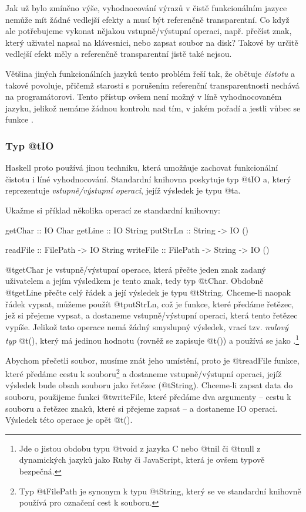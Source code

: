 Jak už bylo zmíněno výše, vyhodnocování výrazů v čistě funkcionálním jazyce
nemůže mít žádné vedlejší efekty a musí být referenčně transparentní. Co když
ale potřebujeme vykonat nějakou vstupně/výstupní operaci, např. přečíst znak,
který uživatel napsal na klávesnici, nebo zapsat soubor na disk? Takové
 by určitě vedlejší efekt měly a referenčně transparentní jistě také
nejsou.

Většina jiných funkcionálních jazyků tento problém řeší tak, že obětuje
\emph{čistotu} a takové  povoluje, přičemž starosti s
porušením referenční transparentnosti nechává na programátorovi. Tento přístup
ovšem není možný v líně vyhodnocovaném jazyku, jelikož nemáme žádnou kontrolu
nad tím, v jakém pořadí a jestli vůbec se funkce .

\subsubsection{\texorpdfstring{Typ @t{IO}}{Typ IO}}

Haskell proto používá jinou techniku, která umožňuje zachovat funkcionální
čistotu i líné vyhodnocování. Standardní knihovna poskytuje typ @t{IO a}, který
reprezentuje \emph{vstupně/výstupní operaci}, jejíž výsledek je typu @t{a}.

Ukažme si příklad několika operací ze standardní knihovny:

\begin{haskell}
getChar :: IO Char
getLine :: IO String
putStrLn :: String -> IO ()

readFile :: FilePath -> IO String
writeFile :: FilePath -> String -> IO ()
\end{haskell}

@t{getChar} je vstupně/výstupní operace, která přečte jeden znak zadaný
uživatelem a jejím výsledkem je tento znak, tedy typ @t{Char}. Obdobně
@t{getLine} přečte celý řádek a její výsledek je typu @t{String}. Chceme-li
naopak řádek vypsat, můžeme použít @t{putStrLn}, což je funkce, které předáme
řetězec, jež si přejeme vypsat, a dostaneme vstupně/výstupní operaci, která
tento řetězec vypíše. Jelikož tato operace nemá žádný smyslupný výsledek, vrací
tzv. \emph{nulový typ} @t{()}, který má jedinou hodnotu (rovněž se zapisuje
@t{()}) a používá se jako .\footnote{Jde o jistou obdobu typu
  @t{void} z jazyka C nebo @t{nil} či @t{null} z dynamických jazyků jako Ruby či
JavaScript, která je ovšem typově bezpečná.}

Abychom přečetli soubor, musíme znát jeho umístění, proto je @t{readFile}
funkce, které předáme cestu k souboru\footnote{Typ @t{FilePath} je synonym k
  typu @t{String}, který se ve standardní knihovně používá pro označení cest k
souboru.} a dostaneme vstupně/výstupní operaci, jejíž výsledek bude obsah
souboru jako řetězec (@t{String}). Chceme-li zapsat data do souboru, použijeme
funkci @t{writeFile}, které předáme dva argumenty -- cestu k souboru a řetězec
znaků, které si přejeme zapsat -- a dostaneme IO operaci. Výsledek této operace
je opět @t{()}.


